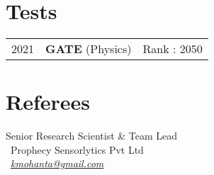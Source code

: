 \documentclass[]{psyqe-resume-openfont}
\begin{document}
%
%
\newpage
%
%
\begin{minipage}[t]{0.34\textwidth}


\section{Tests}
\begin{tabular}{rll}
    2021 & \textbf{GATE} (Physics) & Rank : 2050 \\
\end{tabular}
\sectionsep
\section{Referees}

\location{\textcolor{primary}{Dr. Kallol Mohanta}}
Senior Research Scientist \& Team Lead \\
 \ Prophecy Sensorlytics Pvt Ltd \\
 \ 
\href{mailto:kmohanta@gmail.com}{\textit{kmohanta@gmail.com}}


\end{minipage}
\end{document}
